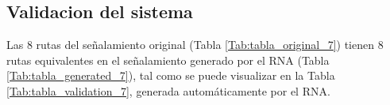 \subsection{Validacion del sistema}

    Las 8 rutas del señalamiento original (Tabla \ref{Tab:tabla_original_7}) tienen 8 rutas equivalentes en el señalamiento generado por el RNA (Tabla \ref{Tab:tabla_generated_7}), tal como se puede visualizar en la Tabla \ref{Tab:tabla_validation_7}, generada automáticamente por el RNA.

    \begin{table}[H]
        {
        \caption{Equivalencias entre las rutas originales y las generadas por el RNA.}
        \label{Tab:tabla_validation_7}
        \centering
            \begin{center}
            \end{center}
        }    
    \end{table}
    
